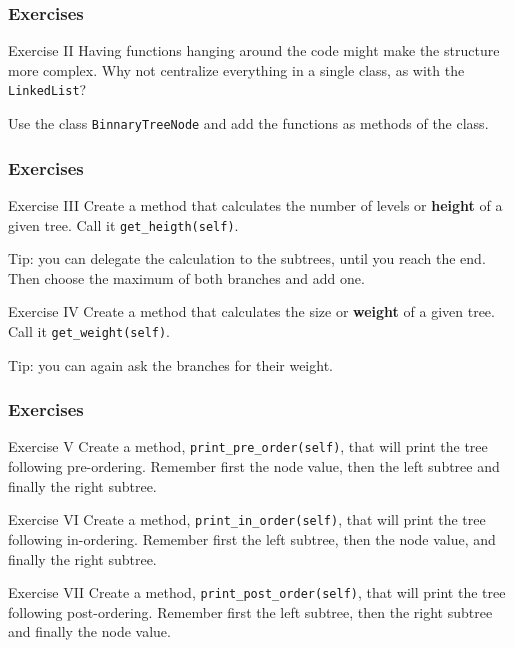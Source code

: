 \documentclass[11pt,handout]{beamer}
\begin{document}
\begin{frame}\frametitle{Exercises}
\begin{block}{Exercise II}
Having functions hanging around the code might make the structure more complex. Why not centralize everything in a single class, as with the \lstinline|LinkedList|?

Use the class \lstinline|BinnaryTreeNode| and add the functions as methods of the class.
\end{block}
\end{frame}

\begin{frame}\frametitle{Exercises}
\begin{block}{Exercise III}
Create a method that calculates the number of levels or \textbf{height} of a given tree. Call it \lstinline|get_heigth(self)|.

Tip: you can delegate the calculation to the subtrees, until you reach the end. Then choose the maximum of both branches and add one.
\end{block}
\begin{block}{Exercise IV}
Create a method that calculates the size or \textbf{weight} of a given tree. Call it \lstinline|get_weight(self)|.

Tip: you can again ask the branches for their weight.
\end{block}
\end{frame}

\begin{frame}\frametitle{Exercises}
\begin{block}{Exercise V}
Create a method, \lstinline|print_pre_order(self)|, that will print the tree following pre-ordering. Remember first the node value, then the left subtree and finally the right subtree.
\end{block}
\begin{block}{Exercise VI}
Create a method, \lstinline|print_in_order(self)|, that will print the tree following in-ordering. Remember first the left subtree, then the node value, and finally the right subtree.
\end{block}
\begin{block}{Exercise VII}
Create a method, \lstinline|print_post_order(self)|, that will print the tree following post-ordering. Remember first the left subtree, then the right subtree and finally the node value.
\end{block}
\end{frame}
\end{document}
